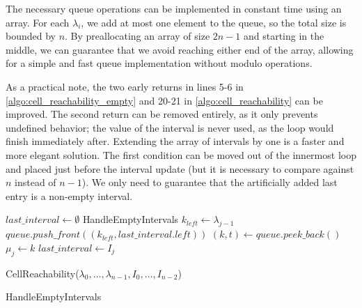 The necessary queue operations can be implemented in constant time using an array. For each \(\lambda_i\), we add at most one element to the queue, so the total size is bounded by \(n\). By preallocating an array of size \(2n - 1\) and starting in the middle, we can guarantee that we avoid reaching either end of the array, allowing for a simple and fast queue implementation without modulo operations.

As a practical note, the two early returns in lines 5-6 in \cref{algo:cell_reachability_empty} and 20-21 in \cref{algo:cell_reachability} can be improved. The second return can be removed entirely, as it only prevents undefined behavior; the value of the interval is never used, as the loop would finish immediately after. Extending the array of intervals by one is a faster and more elegant solution. The first condition can be moved out of the innermost loop and placed just before the interval update (but it is necessary to compare against \(n\) instead of \(n-1\)). We only need to guarantee that the artificially added last entry is a non-empty interval.

\begin{algorithm}[htb]
  \DontPrintSemicolon
  \BlankLine
	\(last\_interval \gets \emptyset\) \;
	 {
		HandleEmptyIntervals\;
		\(k_{left} \gets \lambda_{j-1}\)\;
		\(queue.push\_front((k_{left}, last\_interval.left))\) \;
		\((k, t) \gets queue.peek\_back()\) \;
		\(\mu_j \gets k\) \;
		\(last\_interval \gets I_j\)
	}
	\caption{CellReachability(\(\lambda_0, \dots, \lambda_{n-1}, I_0, \dots, I_{n-2}\))}
  \label{algo:cell_reachability}
\end{algorithm}

\begin{algorithm}[htb]
  \DontPrintSemicolon
  \BlankLine
	\caption{HandleEmptyIntervals}
  \label{algo:cell_reachability_empty}
\end{algorithm}


